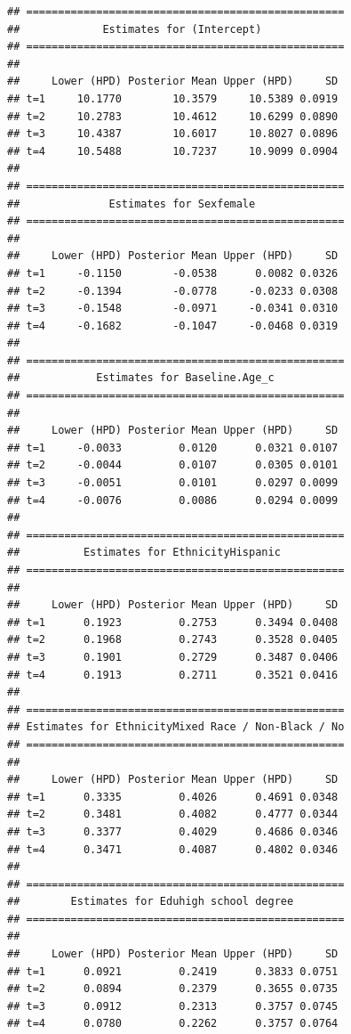 \documentclass[a4paper, preprint, 3p,
authoryear]{elsarticle} %
\begin{document}
\begin{verbatim}
## ==================================================
##             Estimates for (Intercept)
## ==================================================
## 
##     Lower (HPD) Posterior Mean Upper (HPD)     SD
## t=1     10.1770        10.3579     10.5389 0.0919
## t=2     10.2783        10.4612     10.6299 0.0890
## t=3     10.4387        10.6017     10.8027 0.0896
## t=4     10.5488        10.7237     10.9099 0.0904
## 
## ==================================================
##              Estimates for Sexfemale
## ==================================================
## 
##     Lower (HPD) Posterior Mean Upper (HPD)     SD
## t=1     -0.1150        -0.0538      0.0082 0.0326
## t=2     -0.1394        -0.0778     -0.0233 0.0308
## t=3     -0.1548        -0.0971     -0.0341 0.0310
## t=4     -0.1682        -0.1047     -0.0468 0.0319
## 
## ==================================================
##            Estimates for Baseline.Age_c
## ==================================================
## 
##     Lower (HPD) Posterior Mean Upper (HPD)     SD
## t=1     -0.0033         0.0120      0.0321 0.0107
## t=2     -0.0044         0.0107      0.0305 0.0101
## t=3     -0.0051         0.0101      0.0297 0.0099
## t=4     -0.0076         0.0086      0.0294 0.0099
## 
## ==================================================
##          Estimates for EthnicityHispanic
## ==================================================
## 
##     Lower (HPD) Posterior Mean Upper (HPD)     SD
## t=1      0.1923         0.2753      0.3494 0.0408
## t=2      0.1968         0.2743      0.3528 0.0405
## t=3      0.1901         0.2729      0.3487 0.0406
## t=4      0.1913         0.2711      0.3521 0.0416
## 
## ==================================================
## Estimates for EthnicityMixed Race / Non-Black / No
## ==================================================
## 
##     Lower (HPD) Posterior Mean Upper (HPD)     SD
## t=1      0.3335         0.4026      0.4691 0.0348
## t=2      0.3481         0.4082      0.4777 0.0344
## t=3      0.3377         0.4029      0.4686 0.0346
## t=4      0.3471         0.4087      0.4802 0.0346
## 
## ==================================================
##        Estimates for Eduhigh school degree
## ==================================================
## 
##     Lower (HPD) Posterior Mean Upper (HPD)     SD
## t=1      0.0921         0.2419      0.3833 0.0751
## t=2      0.0894         0.2379      0.3655 0.0735
## t=3      0.0912         0.2313      0.3757 0.0745
## t=4      0.0780         0.2262      0.3757 0.0764

\end{verbatim}
\end{document}
